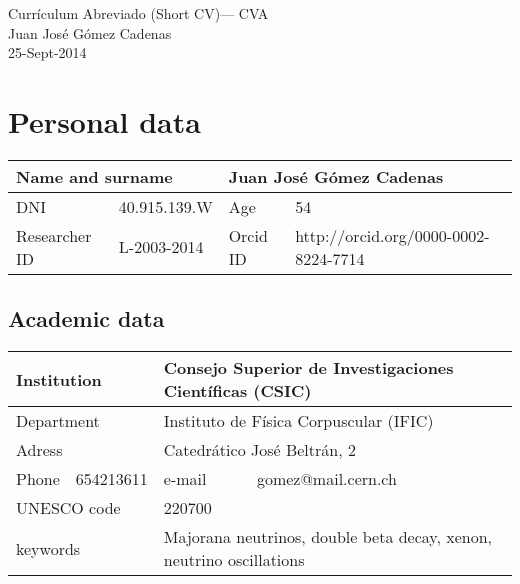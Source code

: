 \documentclass[a4paper,11pt,oneside]{article}
\begin{document}


\begin{center}
{\Large \textsf{Currículum Abreviado (Short CV)--- CVA}} \\ \vspace{0.3cm}
{\Large  \textsf{Juan José Gómez Cadenas}} \\ 
{\Large \textsf{25-Sept-2014}} 
\end{center}

\section{Personal data}
\begin{table}[h!]
\begin{center}
\begin{tabular}{| l | l | l | l |}
\hline
\multicolumn{2}{|l|}{Name and surname } & \multicolumn{2}{|l|}{ Juan José Gómez Cadenas}\\
\hline
DNI & 40.915.139.W & Age & 54 \\
\hline
Researcher ID &  L-2003-2014 &  Orcid ID &  http://orcid.org/0000-0002-8224-7714 \\
\hline
\end{tabular}
\label{tab:personal}
\end{center}
\end{table} 

\subsection{Academic data}
\begin{table}[h!]
\begin{center}
\begin{tabular}{| l | l | l | l |}
\hline
\multicolumn{2}{|l|}{Institution} & \multicolumn{2}{|l|}{ Consejo Superior de Investigaciones Científicas  (CSIC)}\\
\hline
\multicolumn{2}{|l|}{Department} & \multicolumn{2}{|l|}{ Instituto de Física Corpuscular (IFIC) }\\
\hline
\multicolumn{2}{|l|}{Adress} & \multicolumn{2}{|l|}{ Catedrático José Beltrán, 2  }\\
\hline
Phone & 654213611 & e-mail & gomez@mail.cern.ch\\
\hline
\multicolumn{2}{|l|}{UNESCO code} & \multicolumn{2}{|l|}{ 220700  }\\
\hline
\multicolumn{2}{|l|}{keywords} & \multicolumn{2}{|l|}{ Majorana neutrinos, double beta decay, xenon, neutrino oscillations}\\
\hline
\end{tabular}
\label{tab:profesional}
\end{center}
\end{table} 
\end{document}
